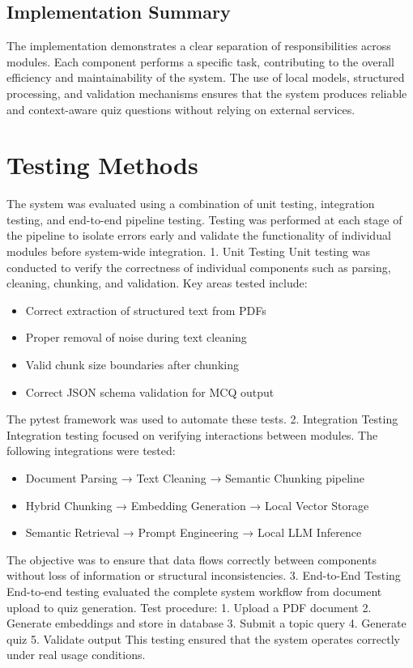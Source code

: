 \documentclass[12pt,a4paper]{report}
\begin{document}
\subsection{Implementation Summary}
The implementation demonstrates a clear separation of responsibilities across modules. Each component performs a specific task, contributing to the overall efficiency and maintainability of the system.
The use of local models, structured processing, and validation mechanisms ensures that the system produces reliable and context-aware quiz questions without relying on external services.
\section{Testing Methods}
The system was evaluated using a combination of unit testing, integration testing, and end-to-end pipeline testing.
Testing was performed at each stage of the pipeline to isolate errors early and validate the functionality of individual modules before system-wide integration.
1. Unit Testing
Unit testing was conducted to verify the correctness of individual components such as parsing, cleaning, chunking, and validation.
Key areas tested include:
\begin{itemize}
\item Correct extraction of structured text from PDFs
\item Proper removal of noise during text cleaning
\item Valid chunk size boundaries after chunking
\item Correct JSON schema validation for MCQ output
\end{itemize}
The pytest framework was used to automate these tests.
2. Integration Testing
Integration testing focused on verifying interactions between modules.
The following integrations were tested:
\begin{itemize}
\item Document Parsing → Text Cleaning → Semantic Chunking pipeline
\item Hybrid Chunking → Embedding Generation → Local Vector Storage
\item Semantic Retrieval → Prompt Engineering → Local LLM Inference
\end{itemize}
The objective was to ensure that data flows correctly between components without loss of information or structural inconsistencies.
3. End-to-End Testing
End-to-end testing evaluated the complete system workflow from document upload to quiz generation.
Test procedure:
1. Upload a PDF document
2. Generate embeddings and store in database
3. Submit a topic query
4. Generate quiz
5. Validate output
This testing ensured that the system operates correctly under real usage conditions.
\end{document}
